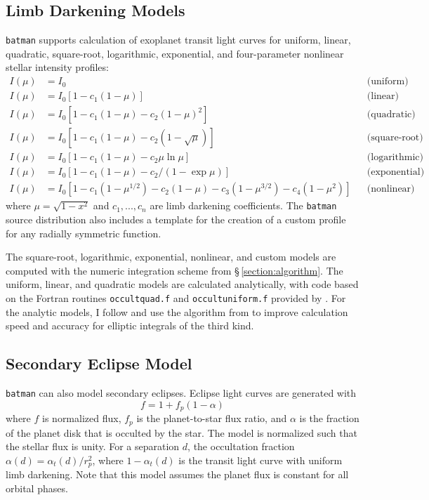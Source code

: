 \documentclass[12pt,preprint]{aastex}
\begin{document}
\subsection{Limb Darkening Models}
\texttt{batman} supports calculation of exoplanet transit light curves for uniform, linear, quadratic, square-root, logarithmic, exponential, and four-parameter nonlinear stellar intensity profiles:
\begin{align}
  I(\mu) &= I_0                                                                         & &\text{(uniform)}             \\
  I(\mu) &= I_0[1 - c_1(1-\mu)]                                                         & &\text{(linear)}              \\
  I(\mu) &= I_0[1 - c_1(1 - \mu) - c_2(1-\mu)^2]                                        & &\text{(quadratic)}           \\
  I(\mu) &= I_0[1 - c_1(1 - \mu) - c_2(1-\sqrt{\mu})]                                   & &\text{(square-root)}         \\
  I(\mu) &= I_0[1 - c_1(1 - \mu) - c_2\mu\ln{\mu}]                                      & &\text{(logarithmic)}         \\
  I(\mu) &= I_0\left[1 - c_1(1 - \mu) - c_2/(1-\exp{\mu})\right]                  	& &\text{(exponential)}         \\
  I(\mu) &= I_0[1 - c_1(1-\mu^{1/2}) - c_2(1- \mu) - c_3(1-\mu^{3/2}) - c_4(1-\mu^2)]   & &\text{(nonlinear)}
\end{align}
where $\mu = \sqrt{1-x^2}$ and $c_1, ..., c_n$ are limb darkening coefficients.  The \texttt{batman} source distribution also includes a template for the creation of a custom profile for any radially symmetric function.  

The square-root, logarithmic, exponential, nonlinear, and custom models are computed with the numeric integration scheme from \S\,\ref{section:algorithm}.  The uniform, linear, and quadratic models are calculated analytically, with code based on the Fortran routines \texttt{occultquad.f} and \texttt{occultuniform.f} provided by \cite{mandel02}. For the analytic models, I follow \cite{eastman13} and use the algorithm from \cite{bulirsch65} to improve calculation speed and accuracy for elliptic integrals of the third kind.

\subsection{Secondary Eclipse Model}
\texttt{batman} can also model secondary eclipses. Eclipse light curves are generated with 
$$
f = 1 + f_p(1-\alpha)
$$
where $f$ is normalized flux, $f_p$ is the planet-to-star flux ratio, and $\alpha$ is the fraction of the planet disk that is occulted by the star. The model is normalized such that the stellar flux is unity.  For a separation $d$, the occultation fraction $\alpha(d) = \alpha_t(d)/r_p^2$, where $1 - \alpha_t(d)$ is the transit light curve with uniform limb darkening. Note that this model assumes the planet flux is constant for all orbital phases.
\end{document}
